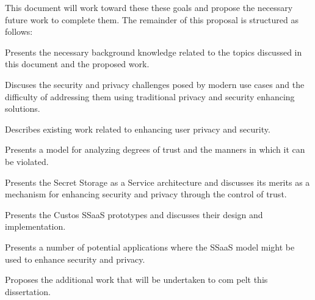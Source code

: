 This document will work toward these these goals and propose the
necessary future work to complete them. The remainder of this proposal
is structured as follows:

\begin{packed_desc}
\item[Chapter~\ref{chap:background} - Background:] Presents the
  necessary background knowledge related to the topics discussed in
  this document and the proposed work.
\item[Chapter~\ref{chap:challenges} - Challenges:] Discuses the
  security and privacy challenges posed by modern use cases and the
  difficulty of addressing them using traditional privacy and security
  enhancing solutions.
\item[Chapter~\ref{chap:related} - Related Work:] Describes existing
  work related to enhancing user privacy and security.
\item[Chapter~\ref{chap:trust} - Trust Model:] Presents a model for
  analyzing degrees of trust and the manners in which it can be
  violated.
\item[Chapter~\ref{chap:ssaas} - SSaaS:] Presents the Secret Storage
  as a Service architecture and discusses its merits as a mechanism
  for enhancing security and privacy through the control of trust.
\item[Chapter~\ref{chap:custos} - Custos:] Presents the Custos SSaaS
  prototypes and discusses their design and implementation.
\item[Chapter~\ref{chap:apps} - Applications:] Presents a number of
  potential applications where the SSaaS model might be used to
  enhance security and privacy.
\item[Chapter~\ref{chap:planned} - Proposed Work:] Proposes the
  additional work that will be undertaken to com pelt this
  dissertation.
\end{packed_desc}

